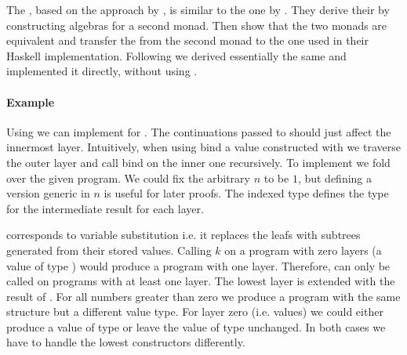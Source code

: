 The , based on the approach by
\textcite{DBLP:journals/corr/abs-1806-05230}, is similar to the one by
\textcite{DBLP:conf/lics/PirogSWJ18}.
They derive their  by constructing algebras for a
second monad.
Then  show that the two monads are
equivalent and transfer the  from the
second monad to the one used in their Haskell implementation.
Following \textcite{DBLP:journals/corr/abs-1806-05230} we derived essentially the
same  and implemented it directly, without using
\AgdaFunction{>>=}.

\paragraph{Example}
Using  we can implement \AgdaFunction{>>=} for
\AgdaSpace{}\AgdaSpace{}.
The continuations  passed to \AgdaFunction{>>=} should just
affect the innermost layer.
Intuitively, when using bind a value constructed with
 we traverse the outer layer and call bind on the
inner one recursively.
To implement \AgdaFunction{>>=} we fold over the given program.
We could fix the arbitrary $n$ to be $1$, but defining a version generic in $n$
is useful for later proofs.
The  indexed type  defines the type for the
intermediate result for each layer.

\AgdaFunction{>>=} corresponds to variable substitution i.e. it replaces the
 leafs with subtrees generated from their stored
values.
Calling $k$ on a program with zero layers (a value of type )
would produce a program with one layer.
Therefore, \bind{} can only be called on programs with at least one layer.
The lowest layer is extended with the result of .
For all numbers greater than zero we produce a program with the same structure
but a different value type.
For layer zero (i.e. values) we could either produce a value of type 
\AgdaSpace{}\AgdaSpace{}
or leave the value of type  unchanged.
In both cases we have to handle the lowest 
constructors differently.

